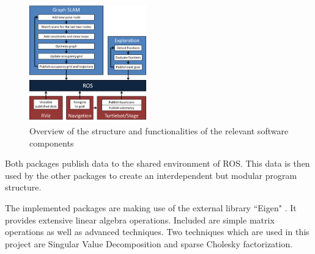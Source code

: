 \documentclass{ba-kecs}
\begin{document}
\begin{figure}[htbp]
	\centering
		\includegraphics[width=0.45\textwidth]{figures/Program_structure.png}
	\caption{Overview of the structure and functionalities of the relevant software components}
	\label{fig:program_structure}
\end{figure}

Both packages publish data to the shared environment of ROS. This data is then used by the other packages to create an interdependent but modular program structure.

The implemented packages are making use of the external library ``Eigen" \citep{eigen}. It provides extensive linear algebra operations. Included are simple matrix operations as well as advanced techniques. Two techniques which are used in this project are Singular Value Decomposition and sparse Cholesky factorization.
\end{document}
